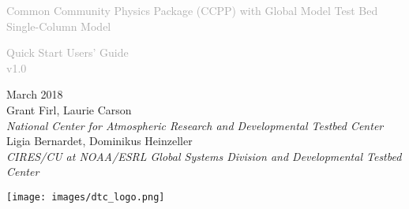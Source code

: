 \begin{titlepage}
\renewcommand{\thefootnote}{\fnsymbol{footnote}}

\vspace*{1em}
\noindent

\begin{center}
\textcolor{darkgray}{\bigsf Common Community Physics Package (CCPP) with Global Model Test Bed Single-Column Model\\}
\vspace*{1em}\par

\textcolor{darkgray}{\bigst Quick Start Users' Guide \\v1.0}
\vspace*{1em}\par

\large{March 2018}\\[4em]

Grant Firl, Laurie Carson\\
\textit{\small{National Center for Atmospheric Research and Developmental Testbed Center}}\\[4em]

Ligia Bernardet, Dominikus Heinzeller\\
\textit{\small{CIRES/CU at NOAA/ESRL Global Systems Division and Developmental Testbed Center}}\\[4em]

\vspace{4em}

\texttt{[image: images/dtc\_logo.png]}\\[2em]

\end{center}
\end{titlepage}
\pagebreak{}




